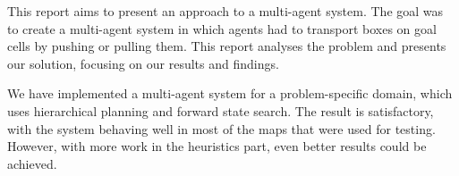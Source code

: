

This report aims to present an approach to a multi-agent system. The goal was to create a multi-agent system in which agents had to transport boxes on goal cells by pushing or pulling them. This report analyses the problem and presents our solution, focusing on our results and findings.

We have implemented a multi-agent system for a problem-specific domain, which uses hierarchical planning and forward state search. The result is satisfactory, with the system behaving well in most of the maps that were used for testing. However, with more work in the heuristics part, even better results could be achieved.
